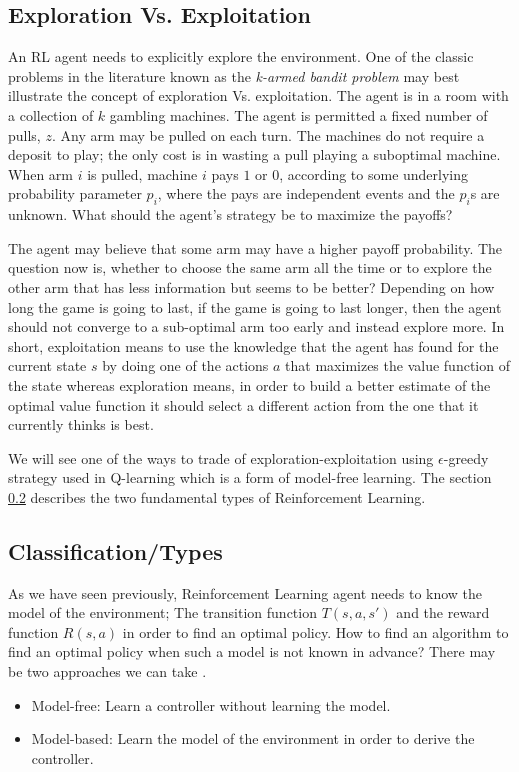 \documentclass[12pt]{report}
\begin{document}
\subsection{Exploration Vs. Exploitation}
An RL agent needs to explicitly explore the environment. One of the classic problems in the literature known as the \textit{k-armed bandit problem} \cite{berry1985bandit} may best illustrate the concept of exploration Vs. exploitation. The agent is in a room with a collection of
$k$ gambling machines. The agent is permitted a fixed number of pulls, $z$. Any arm may be pulled on each turn. The machines do not require a deposit to play; the only cost is in wasting a pull playing a suboptimal machine. When arm $i$ is pulled, machine $i$ pays $1$ or $0$, according to some underlying
probability parameter $p_i$, where the pays are independent events and the $p_i$s are unknown.
What should the agent's strategy be to maximize the payoffs?\par 
The agent may believe that some arm may have a higher payoff probability. The question now is, whether to choose the same arm all the time or to explore the other arm that has less information but seems to be better? Depending on how long the game is going to last, if the game is going to last longer, then the agent should not converge to a sub-optimal arm too early and instead explore more. In short, 
exploitation means to use the knowledge that the agent has found for the current state $s$ by doing one of the actions $a$ that maximizes the value function of the state whereas exploration means, in order to build a better estimate of the optimal value function it should select a different action from the one that it currently thinks is best.\par 
We will see one of the ways to trade of exploration-exploitation using $\epsilon$-greedy strategy used in Q-learning which is a form of model-free learning. The section \ref{types} describes the two fundamental types of Reinforcement Learning.


\subsection{Classification/Types}
\label{types}
As we have seen previously, Reinforcement Learning agent needs to know the model of the environment; The transition function $T(s,a,s')$ and the reward function $R(s,a)$ in order to find an optimal policy. How to find an algorithm to find an optimal policy when such a model is not known in advance? There may be two approaches we can take \cite{kaelbling1996reinforcement}.
\begin{itemize}
\item Model-free: Learn a controller without learning the model.
\item Model-based: Learn the model of the environment in order to derive the controller.
\end{itemize}
\end{document}
